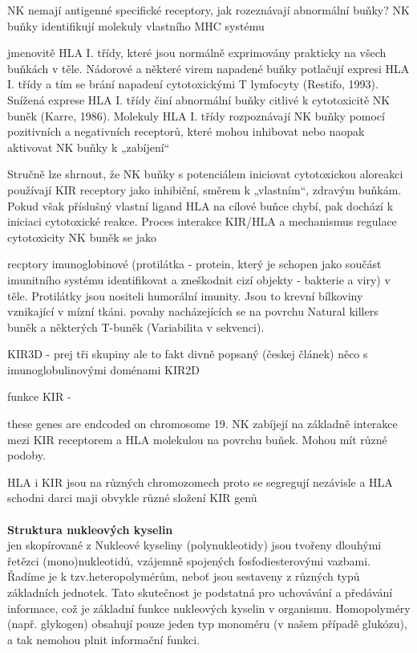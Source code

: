\documentclass[czech,DP]{thesiskiv}
\begin{document}
NK nemají antigenné specifické receptory, jak rozeznávají abnormální buňky? 
NK buňky identifikují molekuly vlastního MHC systému 

 jmenovitě HLA I. třídy, které jsou normálně exprimovány
prakticky na všech buňkách v těle. Nádorové a některé virem napadené buňky potlačují
expresi HLA I. třídy a tím se brání napadení cytotoxickými T lymfocyty (Restifo, 1993).
Snížená exprese HLA I. třídy činí abnormální buňky citlivé k cytotoxicitě NK buněk (Karre,
1986). Molekuly HLA I. třídy rozpoznávají NK buňky pomocí pozitivních a negativních 
receptorů, které mohou inhibovat nebo naopak aktivovat NK buňky k „zabíjení“

Stručně lze shrnout, že NK buňky s potenciálem iniciovat cytotoxickou aloreakci používají
KIR receptory jako inhibiční, směrem k „vlastním“, zdravým buňkám. Pokud však příslušný
vlastní ligand HLA na cílové buňce chybí, pak dochází k iniciaci cytotoxické reakce. Proces
interakce KIR/HLA a mechanismus regulace cytotoxicity NK buněk se jako 

recptory imunoglobinové (protilátka - protein, který je schopen jako součást imunitního systému identifikovat a zneškodnit cizí objekty - bakterie a viry) v těle. Protilátky jsou nositeli humorální imunity. Jsou to krevní bílkoviny vznikající v mízní tkáni.  povahy nacházejících se na povrchu Natural killers buněk a některých T-buněk (Variabilita v sekvenci).

KIR3D - prej tři skupiny ale to fakt divně popsaný (českej článek) něco s imunoglobulinovými doménami
KIR2D

funkce KIR - 

these genes are endcoded on chromosome 19. NK zabíjejí na základně interakce mezi KIR receptorem a HLA molekulou na povrchu buňek. Mohou mít různé podoby.

HLA i KIR jsou na různých chromozomech proto se segregují nezávisle a HLA schodni darci maji obvykle různé složení KIR genů
\\
\\
\textbf{Struktura nukleových kyselin} \\
jen skopírované z %
Nukleové kyseliny (polynukleotidy) jsou tvořeny dlouhými řetězci (mono)nukleotidů, vzájemně spojených fosfodiesterovými vazbami. Řadíme je k tzv.heteropolymérům, neboť jsou sestaveny z různých typů základních jednotek. Tato skutečnost je podstatná pro uchovávání a předávání informace, což je základní funkce nukleových kyselin v organismu. Homopolyméry (např. glykogen) obsahují pouze jeden typ monoméru (v našem případě glukózu), a tak nemohou plnit informační funkci.
\end{document}
